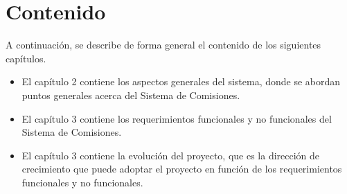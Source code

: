 \section{Contenido}


A continuación, se describe de forma general el contenido de los siguientes capítulos.
\begin{itemize}
	
	\item El capítulo 2 contiene los aspectos generales del sistema, donde se abordan puntos generales acerca del Sistema de Comisiones.
	\item El capítulo 3 contiene los requerimientos funcionales y no funcionales del Sistema de Comisiones.
	\item El capítulo 3 contiene la evolución del proyecto, que es la dirección de crecimiento que puede adoptar el proyecto en función de los requerimientos funcionales y no funcionales.
\end{itemize}


